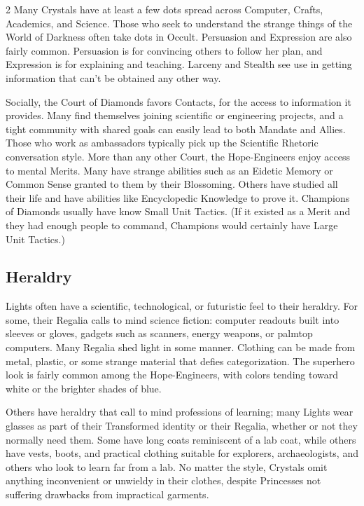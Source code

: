 \begin{multicols}{2}
Many Crystals have at least a few dots spread across Computer, Crafts, Academics, and Science. Those who seek to understand the strange things of the World of Darkness often take dots in Occult. Persuasion and Expression are also fairly common. Persuasion is for convincing others to follow her plan, and Expression is for explaining and teaching. Larceny and Stealth see use in getting information that can't be obtained any other way.

Socially, the Court of Diamonds favors Contacts, for the access to information it provides. Many find themselves joining scientific or engineering projects, and a tight community with shared goals can easily lead to both Mandate and Allies. Those who work as ambassadors typically pick up the Scientific Rhetoric conversation style. More than any other Court, the Hope-Engineers enjoy access to mental Merits. Many have strange abilities such as an Eidetic Memory or Common Sense granted to them by their Blossoming. Others have studied all their life and have abilities like Encyclopedic Knowledge to prove it. Champions of Diamonds usually have know Small Unit Tactics. (If it existed as a Merit and they had enough people to command, Champions would certainly have Large Unit Tactics.)

\subsection*{Heraldry}
Lights often have a scientific, technological, or futuristic feel to their heraldry. For some, their Regalia calls to mind science fiction: computer readouts built into sleeves or gloves, gadgets such as scanners, energy weapons, or palmtop computers. Many Regalia shed light in some manner. Clothing can be made from metal, plastic, or some strange material that defies categorization. The superhero look is fairly common among the Hope-Engineers, with colors tending toward white or the brighter shades of blue. 

Others have heraldry that call to mind professions of learning; many Lights wear glasses as part of their Transformed identity or their Regalia, whether or not they normally need them. Some have long coats reminiscent of a lab coat, while others have vests, boots, and practical clothing suitable for explorers, archaeologists, and others who look to learn far from a lab. No matter the style, Crystals omit anything inconvenient or unwieldy in their clothes, despite Princesses not suffering drawbacks from impractical garments.


\end{multicols}
